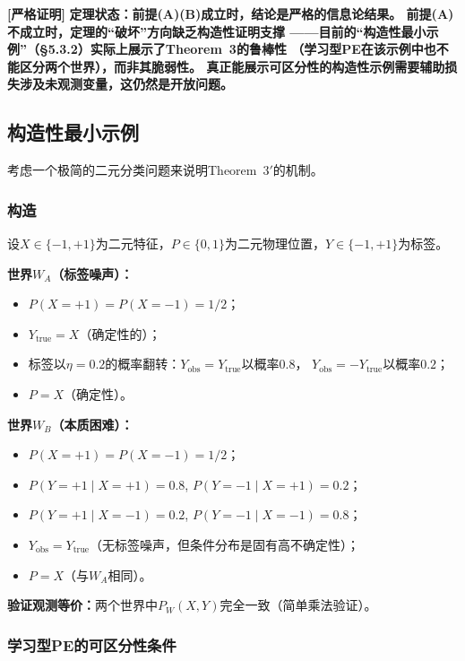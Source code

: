 \documentclass[11pt,a4paper]{article}
\theoremstyle{remark}
\newcommand{\rigorous}{\textnormal{\textbf{[严格证明]}}}
\begin{document}
\rigorous{} \textbf{定理状态：前提(A)(B)成立时，结论是严格的信息论结果。
前提(A)不成立时，定理的``破坏''方向缺乏构造性证明支撑
——目前的``构造性最小示例''（\S5.3.2）实际上展示了Theorem~3的鲁棒性
（学习型PE在该示例中也不能区分两个世界），而非其脆弱性。
真正能展示可区分性的构造性示例需要辅助损失涉及未观测变量，这仍然是开放问题。}

\subsection{构造性最小示例}
\label{sec:4.3}

考虑一个极简的二元分类问题来说明Theorem~$3'$的机制。

\subsubsection{构造}

设$X \in \{-1, +1\}$为二元特征，$P \in \{0, 1\}$为二元物理位置，$Y \in \{-1, +1\}$为标签。

\textbf{世界$W_A$（标签噪声）：}
\begin{itemize}
    \item $P(X=+1) = P(X=-1) = 1/2$；
    \item $Y_{\text{true}} = X$（确定性的）；
    \item 标签以$\eta = 0.2$的概率翻转：$Y_{\text{obs}} = Y_{\text{true}}$以概率$0.8$，
          $Y_{\text{obs}} = -Y_{\text{true}}$以概率$0.2$；
    \item $P = X$（确定性）。
\end{itemize}

\textbf{世界$W_B$（本质困难）：}
\begin{itemize}
    \item $P(X=+1) = P(X=-1) = 1/2$；
    \item $P(Y=+1 \mid X=+1) = 0.8$, $P(Y=-1 \mid X=+1) = 0.2$；
    \item $P(Y=+1 \mid X=-1) = 0.2$, $P(Y=-1 \mid X=-1) = 0.8$；
    \item $Y_{\text{obs}} = Y_{\text{true}}$（无标签噪声，但条件分布是固有高不确定性）；
    \item $P = X$（与$W_A$相同）。
\end{itemize}

\textbf{验证观测等价：}两个世界中$P_{W}(X, Y)$完全一致（简单乘法验证）。

\subsubsection{学习型PE的可区分性条件}
\end{document}
